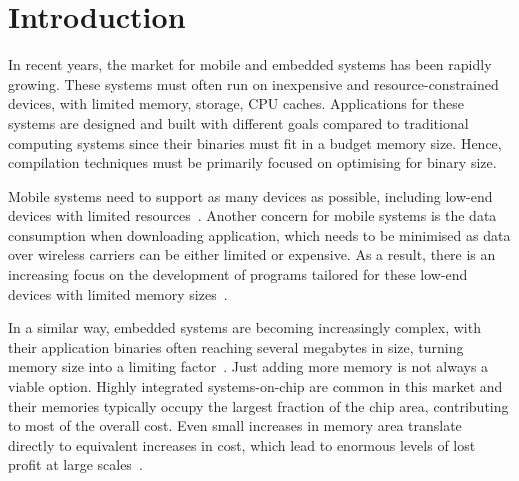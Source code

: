 
\chapter{Introduction}

In recent years, the market for mobile and embedded systems has been rapidly growing.
These systems must often run on inexpensive and resource-constrained devices, with limited memory, storage, CPU caches. %
Applications for these systems are designed and built with different goals compared to traditional computing systems since their binaries must fit in a budget memory size.
Hence, compilation techniques must be primarily focused on optimising for binary size.



Mobile systems need to support as many devices as possible, including low-end devices with limited resources~\cite{hart02,etzo10}.
Another concern for mobile systems is the data consumption when downloading application, which needs to be minimised as data over wireless carriers can be either limited or expensive.
As a result, there is an increasing focus on the development of programs tailored for these low-end devices with limited memory sizes~\cite{androidGo,hahm16}.

In a similar way, embedded systems are becoming increasingly complex, with their application binaries often reaching several megabytes in size, turning memory size into a limiting factor~\cite{plaza18}.
Just adding more memory is not always a viable option.
Highly integrated systems-on-chip are common in this market and their memories typically occupy the largest fraction of the chip area, contributing to most of the overall cost.
Even small increases in memory area translate directly to equivalent increases in cost, which lead to enormous levels of lost profit at large scales~\cite{edler10}.

